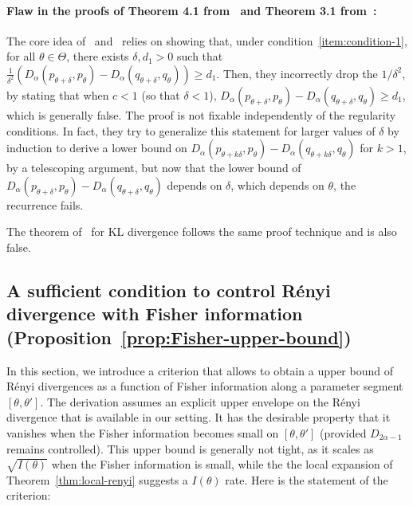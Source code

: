 \documentclass{article}
\theoremstyle{plain}
\theoremstyle{definition}
\theoremstyle{remark}
\begin{document}
\paragraph{Flaw in the proofs of Theorem 4.1 from~\citet{Abbasnejad2006} and Theorem 3.1 from~\citet{Habibi2006}:}
The core idea of~\citet{Abbasnejad2006} and~\citet{Habibi2006} relies on showing that, under condition~\ref{item:condition-1}, for all $\theta \in \Theta$, there exists $\delta, d_1 > 0$ such that $\frac{1}{\delta^2}(D_\alpha(p_{\theta + \delta}, p_\theta) - D_\alpha(q_{\theta + \delta}, q_\theta)) \geq d_1$. Then, they incorrectly drop the $1/\delta^2$, by stating that when $c < 1$ (so that $\delta < 1$), $D_\alpha(p_{\theta + \delta}, p_\theta) - D_\alpha(q_{\theta + \delta}, q_\theta) \geq d_1$, which is generally false. The proof is not fixable independently of the regularity conditions. In fact, they try to generalize this statement for larger values of $\delta$ by induction to derive a lower bound on $D_\alpha(p_{\theta + k\delta}, p_\theta) - D_\alpha(q_{\theta + k\delta}, q_\theta)$ for $k > 1$, by a telescoping argument, but now that the lower bound of $D_\alpha(p_{\theta + \delta}, p_\theta) - D_\alpha(q_{\theta + \delta}, q_\theta)$ depends on $\delta$, which depends on $\theta$, the recurrence fails.

The theorem of~\citet{Habibi2006} for KL divergence follows the same proof technique and is also false.





\subsection{A sufficient condition to control Rényi divergence with Fisher information (Proposition~\ref{prop:Fisher-upper-bound})}
\label{app:prop-Fisher-upper-bound}



In this section, we introduce a criterion that allows to obtain a upper bound of Rényi divergences as a function of Fisher information along a parameter segment $[\theta,\theta']$. The derivation assumes an explicit upper envelope on the Rényi divergence that is available in our setting. It has the desirable property that it vanishes when the Fisher information becomes small on $[\theta,\theta']$ (provided $D_{2\alpha-1}$ remains controlled). This upper bound is generally not tight, as it scales as $\sqrt{I(\theta)}$ when the Fisher information is small, while the the local expansion of Theorem~\ref{thm:local-renyi} suggests a $I(\theta)$ rate. Here is the statement of the criterion:
\end{document}
